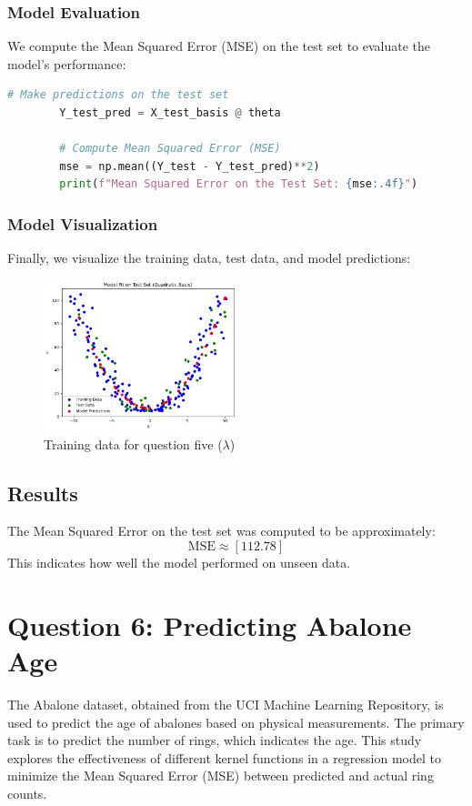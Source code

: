 \documentclass{article}
\begin{document}
	\subsubsection*{Model Evaluation}
	We compute the Mean Squared Error (MSE) on the test set to evaluate the model's performance:
	\begin{lstlisting}[language=Python]
		# Make predictions on the test set
		Y_test_pred = X_test_basis @ theta
		
		# Compute Mean Squared Error (MSE)
		mse = np.mean((Y_test - Y_test_pred)**2)
		print(f"Mean Squared Error on the Test Set: {mse:.4f}")
	\end{lstlisting}
	
	\subsubsection*{Model Visualization}
	Finally, we visualize the training data, test data, and model predictions:
	
	
	\begin{figure}[!h]
	\centering
	\includegraphics[width=0.5\textwidth]{images/q5_predicted.png}
	\caption{Training data for question five (\(\lambda\))}
	\label{fig:q5_predicted}
	\end{figure}
	
	\subsection*{Results}
	The Mean Squared Error on the test set was computed to be approximately: 
	\[
	\text{MSE} \approx [112.78]
	\]
	This indicates how well the model performed on unseen data.
	
	
	\newpage
	\section*{Question 6: Predicting Abalone Age}
	
	The Abalone dataset, obtained from the UCI Machine Learning Repository, is used to predict the age of abalones based on physical measurements. The primary task is to predict the number of rings, which indicates the age. This study explores the effectiveness of different kernel functions in a regression model to minimize the Mean Squared Error (MSE) between predicted and actual ring counts.
	
\end{document}

